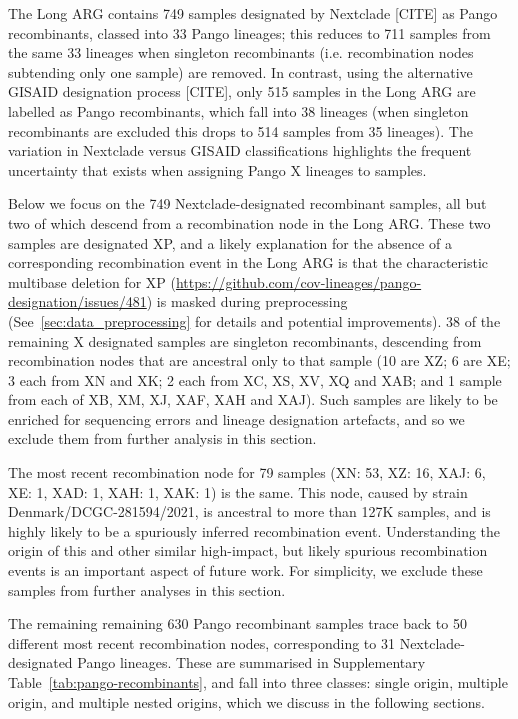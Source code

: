 \documentclass{article}
\begin{document}
The Long ARG contains 749 samples designated by Nextclade [CITE] as Pango
recombinants, classed into 33 Pango lineages; this
reduces to 711 samples from the same 33 lineages
when singleton recombinants (i.e. recombination
nodes subtending only one sample) are removed.
In contrast, using the alternative GISAID designation process [CITE], only
515 samples in the Long ARG are labelled as Pango recombinants,
which fall into 38 lineages (when singleton recombinants are excluded this
drops to 514 samples from 35 lineages). The variation in Nextclade versus
GISAID classifications highlights the frequent uncertainty that exists when
assigning Pango X lineages to samples.

Below we focus on the 749 Nextclade-designated recombinant samples, all
but two of which descend from a recombination node in the Long ARG.
These two samples are designated XP, and a likely
explanation for the absence of a corresponding recombination event in the Long ARG
is that the characteristic multibase deletion for XP
(\url{https://github.com/cov-lineages/pango-designation/issues/481}) is masked
during preprocessing (See~\ref{sec:data_preprocessing} for details and potential
improvements). 38 of the remaining X designated samples are singleton recombinants,
descending
from recombination nodes that are ancestral only to that sample (10 are XZ; 6
are XE;  3 each from XN and XK; 2 each from XC, XS, XV, XQ and XAB; and 1
sample from each of XB, XM, XJ, XAF, XAH and XAJ). Such samples are likely to
be enriched for sequencing errors and lineage designation artefacts, and so we
exclude them from further analysis in this section.

The most recent recombination node for 79 samples (XN: 53, XZ: 16, XAJ: 6, XE:
1, XAD: 1, XAH: 1, XAK: 1) is the same. This node, caused by strain
Denmark/DCGC-281594/2021, is ancestral to more than 127K samples,
and is highly likely to be a spuriously inferred recombination event.
Understanding the origin of this
and other similar high-impact, but likely spurious recombination
events is an important aspect of future work.
For simplicity, we exclude these samples from further analyses in
this section.

The remaining remaining 630 Pango recombinant samples trace back to 50 different
most recent recombination nodes, corresponding to 31
Nextclade-designated Pango lineages. These are summarised
in Supplementary Table~\ref{tab:pango-recombinants}, and fall
into three classes: single origin, multiple origin,
and multiple nested origins, which we discuss in the following sections.
\end{document}
